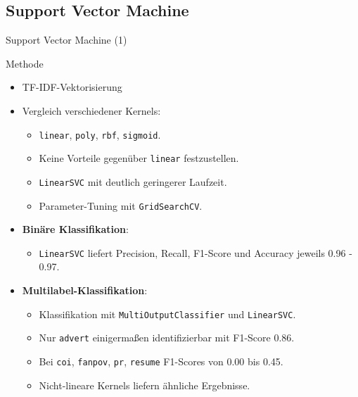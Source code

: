 \documentclass[aspectratio=169]{beamer} %
\begin{document}
\subsection{Support Vector Machine}

\begin{frame}{Support Vector Machine (1)}
    \begin{block}{Methode}
        \begin{itemize}
            \item TF-IDF-Vektorisierung
            \item Vergleich verschiedener Kernels:
                \begin{itemize}
                    \item \texttt{linear}, \texttt{poly}, \texttt{rbf}, \texttt{sigmoid}.
                    \item Keine Vorteile gegen\"uber \texttt{linear} festzustellen.
                    \item \texttt{LinearSVC} mit deutlich geringerer Laufzeit.
                    \item Parameter-Tuning mit \texttt{GridSearchCV}.
                \end{itemize}
            \item \textbf{Bin\"are Klassifikation}:
                \begin{itemize}
                    \item \texttt{LinearSVC} liefert Precision, Recall, F1-Score und Accuracy jeweils 0.96 - 0.97.
                \end{itemize}
            \item \textbf{Multilabel-Klassifikation}:
                \begin{itemize}
                    \item Klassifikation mit \texttt{MultiOutputClassifier} und \texttt{LinearSVC}.
                    \item Nur \texttt{advert} einigerma\ss{}en identifizierbar mit F1-Score 0.86.
                    \item Bei \texttt{coi}, \texttt{fanpov}, \texttt{pr}, \texttt{resume} F1-Scores von 0.00 bis 0.45.
                    \item Nicht-lineare Kernels liefern \"ahnliche Ergebnisse.
                \end{itemize}
        \end{itemize}
    \end{block}
\end{frame}
\end{document}
